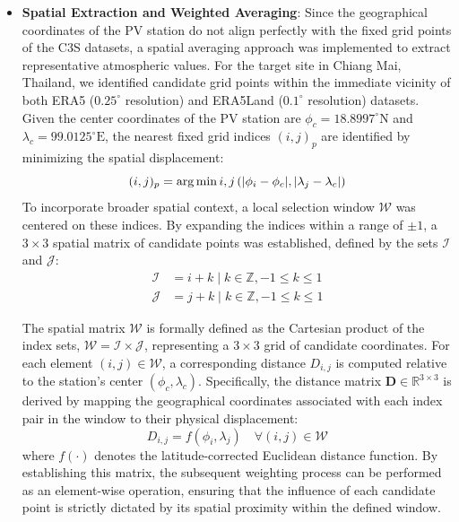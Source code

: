 \documentclass[conference]{IEEEtran}
\begin{document}
\begin{itemize}
	\item \textbf{Spatial Extraction and Weighted Averaging}: Since the geographical coordinates of the PV station do not align perfectly with the fixed grid points of the C3S datasets, a spatial averaging approach was implemented to extract representative atmospheric values. For the target site in Chiang Mai, Thailand, we identified candidate grid points within the immediate vicinity of both ERA5 ($0.25^\circ$ resolution) and ERA5Land ($0.1^\circ$ resolution) datasets. Given the center coordinates of the PV station are $\phi_c=18.8997^\circ\text{N}$ and $\lambda_c=99.0125^\circ\text{E}$, the nearest fixed grid indices $(i, j)_{p}$ are identified by minimizing the spatial displacement:
	\begin{equation}
		\small(i,j)_{p} = \arg\min{i, j} \left( |\phi_i - \phi_c|, |\lambda_j - \lambda_{c}| \right)
	\end{equation}
	To incorporate broader spatial context, a local selection window $\mathcal{W}$ was centered on these indices. By expanding the indices within a range of $\pm 1$, a $3\times3$ spatial matrix of candidate points was established, defined by the sets $\mathcal{I}$ and $\mathcal{J}$:
	\begin{equation}
		\begin{split}
			\mathcal{I} &= { i+k \mid k \in \mathbb{Z}, -1 \leq k \leq 1 } \\
			\mathcal{J} &= { j+k \mid k \in \mathbb{Z}, -1 \leq k \leq 1 }
		\end{split}
	\end{equation}
	
	The spatial matrix $\mathcal{W}$ is formally defined as the Cartesian product of the index sets, $\mathcal{W} = \mathcal{I} \times \mathcal{J}$, representing a $3 \times 3$ grid of candidate coordinates. For each element $(i, j) \in \mathcal{W}$, a corresponding distance $D_{i,j}$ is computed relative to the station's center $(\phi_c, \lambda_c)$. Specifically, the distance matrix $\mathbf{D} \in \mathbb{R}^{3 \times 3}$ is derived by mapping the geographical coordinates associated with each index pair in the window to their physical displacement:
	\begin{equation}
		D_{i,j} = f(\phi_i, \lambda_j) \quad \forall (i, j) \in \mathcal{W}
	\end{equation}
	where $f(\cdot)$ denotes the latitude-corrected Euclidean distance function. By establishing this matrix, the subsequent weighting process can be performed as an element-wise operation, ensuring that the influence of each candidate point is strictly dictated by its spatial proximity within the defined window.
	

\end{itemize}
\end{document}
